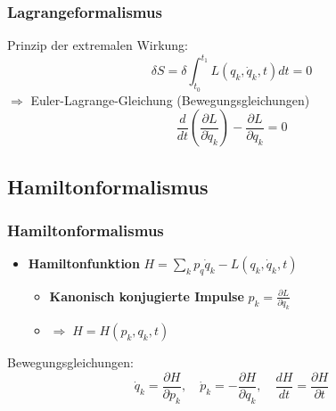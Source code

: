 \documentclass[hyperref={pdfpagelabels=false}]{beamer}
\begin{document}
\begin{frame} 
\frametitle{Lagrangeformalismus}

Prinzip der extremalen Wirkung:
\begin{equation*}
\delta S = \delta \int_{t_0}^{t_1} L(q_k,\dot{q}_k,t) dt =0
\end{equation*} 
$\Rightarrow$ Euler-Lagrange-Gleichung (Bewegungsgleichungen)
\begin{equation*}
\frac{d}{dt}\left(\frac{\partial L}{\partial \dot{q}_k}\right) - \frac{\partial L}{\partial q_k} = 0
\end{equation*} 
\end{frame}


\subsection{Hamiltonformalismus}
\begin{frame} 
\frametitle{Hamiltonformalismus}
\begin{itemize}
\item \textbf{Hamiltonfunktion} $H = \sum\limits_k p_q \dot{q}_k - L(q_k,\dot{q}_k,t)$
\begin{itemize}
\item \textbf{Kanonisch konjugierte Impulse} $p_k = \frac{\partial L}{\partial \dot{q}_k}$
\item $\Rightarrow\; H = H(p_k,q_k,t)$
\end{itemize}
\end{itemize}
\pause
Bewegungsgleichungen: 
\begin{equation*}
\dot{q}_k = \frac{\partial H}{\partial p_k}, \quad\dot{p}_k = - \frac{\partial H}{\partial q_k}, \quad\frac{dH}{dt} = \frac{\partial H}{\partial t}
\end{equation*}
\end{frame}
\end{document}

